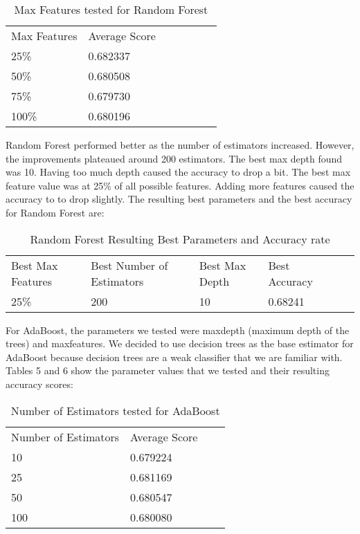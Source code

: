 \documentclass[11pt]{article}
\begin{document}
\begin{table}[H]
\centering
\caption{Max Features tested for Random Forest}
\label{my-label}
\begin{tabular}{lllllll}
Max Features & Average Score &  &  &  &  &  \\
25\%         & 0.682337  &  &  &  &  &  \\
50\%         & 0.680508  &  &  &  &  &  \\
75\%         & 0.679730  &  &  &  &  &  \\
100\%        & 0.680196  &  &  &  &  & 
\end{tabular}
\end{table}

Random Forest performed better as the number of estimators increased. However, the improvements plateaued around 200 estimators. The best max depth found was 10. Having too much depth caused the accuracy to drop a bit. The best max feature value was at 25\% of all possible features. Adding more features caused the accuracy to to drop slightly.
The resulting best parameters and the best accuracy for Random Forest are: 


\begin{table}[H]
\centering
\caption{Random Forest Resulting Best Parameters and Accuracy rate}
\label{my-label}
\begin{tabular}{llllll}
Best Max Features & Best Number of Estimators & Best Max Depth & Best Accuracy       &  &  \\
25\%              & 200                       & 10             & 0.68241 &  & 
\end{tabular}
\end{table}


For AdaBoost, the parameters we tested were max\textunderscore depth (maximum depth of the trees) and max\textunderscore features. We decided to use decision trees as the base estimator for AdaBoost because decision trees are a weak classifier that we are familiar with. Tables 5 and 6 show the parameter values that we tested and their resulting accuracy scores:

\begin{table}[H]
\centering
\caption{Number of Estimators tested for AdaBoost}
\label{my-label}
\begin{tabular}{llll}
Number of Estimators & Average Score &  &  \\
10                   & 0.679224      &  &  \\
25                   & 0.681169      &  &  \\
50                   & 0.680547      &  &  \\
100                  & 0.680080      &  & 
\end{tabular}
\end{table}
\end{document}
